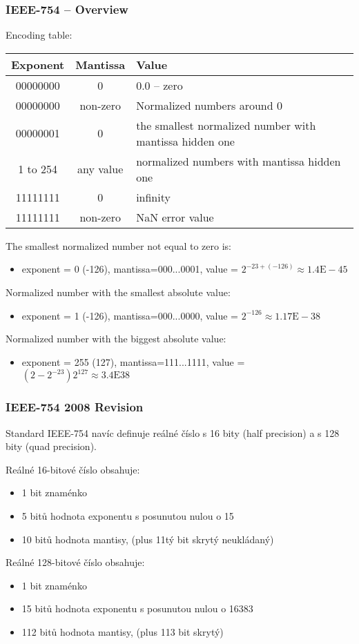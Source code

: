 \documentclass{beamer}
\begin{document}
\begin{frame}[shrink=5]
\frametitle{IEEE-754 -- Overview}

Encoding table:
\begin{tabular}{|c|c|l|}\hline
Exponent & Mantissa &  Value \\ \hline
00000000 & 0 &  0.0 -- zero \\ \hline
00000000 & non-zero &  Normalized numbers around 0 \\ \hline
00000001 & 0 &  the smallest normalized number with mantissa hidden one \\ \hline
\small 1 to 254 & any value &  normalized numbers with mantissa hidden one  \\ \hline
11111111 & 0 &  infinity \\ \hline
11111111 & non-zero &  NaN error value \\ \hline
\end{tabular}
\bigskip

The smallest normalized number not equal to zero is:
\begin{itemize}
\item \small exponent = 0 (-126), mantissa=000...0001, value = $2^{-23+(-126)} \approx 1.4\text{E}-45$
\end{itemize}
Normalized number with the smallest absolute value:
\begin{itemize}
\item \small exponent = 1 (-126), mantissa=000...0000, value = $2^{-126} \approx 1.17\text{E}-38$
\end{itemize}
Normalized number with the biggest absolute value:
\begin{itemize}
\item \small exponent = 255 (127), mantissa=111...1111, value = $(2-2^{-23})2^{127} \approx 3.4\text{E}38$
\end{itemize}
\end{frame}


\begin{frame}
\frametitle{IEEE-754 2008 Revision }

Standard IEEE-754 navíc definuje reálné číslo s 16 bity (half precision) a s 128 bity (quad precision).

Reálné 16-bitové číslo obsahuje:
\begin{itemize}
\item 1 bit znaménko 
\item 5 bitů hodnota exponentu s posunutou nulou o 15
\item 10 bitů hodnota mantisy, (plus 11tý bit skrytý neukládaný)
\end{itemize}
\bigskip
Reálné 128-bitové číslo obsahuje:
\begin{itemize}
\item 1 bit znaménko 
\item 15 bitů hodnota exponentu s posunutou nulou o 16383
\item 112 bitů hodnota mantisy, (plus 113 bit skrytý)
\end{itemize}

\end{frame}
\end{document}

